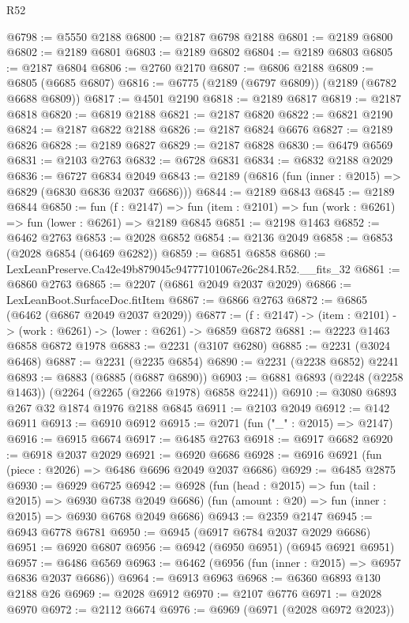 \begin{lexlean}{R52}
\begin{coremodule}
@6798 := @5550 @2188
@6800 := @2187 @6798 @2188
@6801 := @2189 @6800
@6802 := @2189 @6801
@6803 := @2189 @6802
@6804 := @2189 @6803
@6805 := @2187 @6804
@6806 := @2760 @2170
@6807 := @6806 @2188
@6809 := @6805 (@6685 @6807)
@6816 := @6775 (@2189 (@6797 @6809)) (@2189 (@6782 @6688 @6809))
@6817 := @4501 @2190
@6818 := @2189 @6817
@6819 := @2187 @6818
@6820 := @6819 @2188
@6821 := @2187 @6820
@6822 := @6821 @2190
@6824 := @2187 @6822 @2188
@6826 := @2187 @6824 @6676
@6827 := @2189 @6826
@6828 := @2189 @6827
@6829 := @2187 @6828
@6830 := @6479 @6569
@6831 := @2103 @2763
@6832 := @6728 @6831
@6834 := @6832 @2188 @2029
@6836 := @6727 @6834 @2049
@6843 := @2189 (@6816 (fun (inner : @2015) => @6829 (@6830 @6836 @2037 @6686)))
@6844 := @2189 @6843
@6845 := @2189 @6844
@6850 := fun (f : @2147) =>
  fun (item : @2101) => fun (work : @6261) => fun (lower : @6261) => @2189 @6845
@6851 := @2198 @1463
@6852 := @6462 @2763
@6853 := @2028 @6852
@6854 := @2136 @2049
@6858 := @6853 (@2028 @6854 (@6469 @6282))
@6859 := @6851 @6858
@6860 := LexLeanPreserve.Ca42e49b879045c94777101067e26c284.R52.__fits_32
@6861 := @6860 @2763
@6865 := @2207 (@6861 @2049 @2037 @2029)
@6866 := LexLeanBoot.SurfaceDoc.fitItem
@6867 := @6866 @2763
@6872 := @6865 (@6462 (@6867 @2049 @2037 @2029))
@6877 := (f : @2147) -> (item : @2101) -> (work : @6261) -> (lower : @6261) -> @6859 @6872
@6881 := @2223 @1463 @6858 @6872 @1978
@6883 := @2231 (@3107 @6280)
@6885 := @2231 (@3024 @6468)
@6887 := @2231 (@2235 @6854)
@6890 := @2231 (@2238 @6852) @2241
@6893 := @6883 (@6885 (@6887 @6890))
@6903 := @6881 @6893 (@2248 (@2258 @1463)) (@2264 (@2265 (@2266 @1978) @6858 @2241))
@6910 := @3080 @6893 @267 @32 @1874 @1976 @2188 @6845
@6911 := @2103 @2049
@6912 := @142 @6911
@6913 := @6910 @6912
@6915 := @2071 (fun ("_" : @2015) => @2147)
@6916 := @6915 @6674
@6917 := @6485 @2763
@6918 := @6917 @6682
@6920 := @6918 @2037 @2029
@6921 := @6920 @6686
@6928 := @6916 @6921 (fun (piece : @2026) => @6486 @6696 @2049 @2037 @6686)
@6929 := @6485 @2875
@6930 := @6929 @6725
@6942 := @6928
    (fun (head : @2015) => fun (tail : @2015) => @6930 @6738 @2049 @6686)
    (fun (amount : @20) => fun (inner : @2015) => @6930 @6768 @2049 @6686)
@6943 := @2359 @2147
@6945 := @6943 @6778 @6781
@6950 := @6945 (@6917 @6784 @2037 @2029 @6686)
@6951 := @6920 @6807
@6956 := @6942 (@6950 @6951) (@6945 @6921 @6951)
@6957 := @6486 @6569
@6963 := @6462 (@6956 (fun (inner : @2015) => @6957 @6836 @2037 @6686))
@6964 := @6913 @6963
@6968 := @6360 @6893 @130 @2188 @26
@6969 := @2028 @6912
@6970 := @2107 @6776
@6971 := @2028 @6970
@6972 := @2112 @6674
@6976 := @6969 (@6971 (@2028 @6972 @2023))

\end{coremodule}
\end{lexlean}
